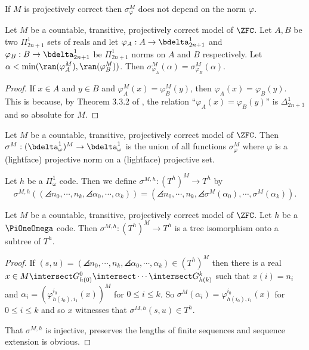 \documentclass[oneside,12pt]{amsart}
\begin{document}
If $M$ is projectively correct then $\sigma^M_{\varphi}$ does not depend on the norm $\varphi$.

\begin{lemma}
Let $M$ be a countable, transitive, projectively correct model of $\ZFC$.
Let $A,B$ be two $\Pi^1_{2n+1}$ sets of reals and let $\varphi_A:A\to\bdelta^1_{2n+1}$
and $\varphi_B:B\to\bdelta^1_{2n+1}$ be $\Pi^1_{2n+1}$ norms on $A$ and $B$ respectively.
Let $\alpha < \min(\ran(\varphi^M_A),\ran(\varphi^M_B))$. Then
$\sigma^M_{\varphi_A}(\alpha) = \sigma^M_{\varphi_B}(\alpha)$.
\end{lemma}
\begin{proof}
If $x\in A$ and $y\in B$ and $\varphi^M_A(x) = \varphi^M_B(y)$, then
$\varphi_A(x)=\varphi_B(y)$. This is because,
by Theorem 3.3.2 of \cite{HarringtonKechris}, the relation
``$\varphi_A(x)=\varphi_B(y)$'' is $\Delta^1_{2n+3}$ and so absolute for $M$.
\end{proof}


\begin{definition}
\label{norm_embedding_def}
Let $M$ be a countable, transitive, projectively correct model of $\ZFC$.
Then $\sigma^M:(\bdelta^1_{\omega})^M\to\bdelta^1_{\omega}$ is the union of all
functions $\sigma^M_{\varphi}$ where $\varphi$ is a (lightface) projective norm on a
(lightface) projective set.

Let $h$ be a $\Pi^1_{\omega}$ code. Then we define
$\sigma^{M,h}:(T^h)^M\to T^h$ by
$$\sigma^{M,h}\left( (\angles{n_0,\cdots, n_k}, \angles{\alpha_0, \cdots, \alpha_k}  ) \right) =
(\angles{n_0,\cdots, n_k}, \angles{\sigma^M(\alpha_0), \cdots, \sigma^M(\alpha_k)}  ).$$
\end{definition}

\begin{lemma}
\label{tree_embedding_lemma}
Let $M$ be a countable, transitive, projectively correct model of $\ZFC$.
Let $h$ be a $\PiOneOmega$ code.
Then $\sigma^{M,h}:(T^h)^M\to T^h$ is a tree isomorphism
onto a subtree of $T^h$.
\end{lemma}
\begin{proof}
If $(s,u) = (\angles{n_0,\cdots, n_k}, \angles{\alpha_0, \cdots, \alpha_k}  ) \in (T^h)^M$
then there is a real $x\in M \intersect G^0_{h(0)} \intersect \cdots \intersect G^k_{h(k)}$ such
that $x(i)=n_i$ and $\alpha_i=(\varphi^{i_0}_{h(i_0),i_1}(x))^M$  for $0\leq i \leq k$.
So $\sigma^M(\alpha_i) = \varphi^{i_0}_{h(i_0),i_1}(x)$ for $0\leq i \leq k$ and so
$x$ witnesses that  $\sigma^{M,h}(s,u)\in T^h$.

That $\sigma^{M,h}$ is injective, preserves the lengths of finite sequences and sequence extension
is obvious.
\end{proof}
\end{document}
